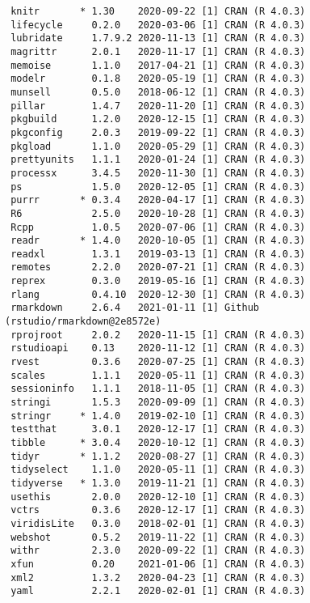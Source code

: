 \documentclass[twoside,12pt,final]{ucthesis-CA2012}
\begin{document}
\begin{ucmainmatter}
\begin{verbatim}
 knitr       * 1.30    2020-09-22 [1] CRAN (R 4.0.3)                       
 lifecycle     0.2.0   2020-03-06 [1] CRAN (R 4.0.3)                       
 lubridate     1.7.9.2 2020-11-13 [1] CRAN (R 4.0.3)                       
 magrittr      2.0.1   2020-11-17 [1] CRAN (R 4.0.3)                       
 memoise       1.1.0   2017-04-21 [1] CRAN (R 4.0.3)                       
 modelr        0.1.8   2020-05-19 [1] CRAN (R 4.0.3)                       
 munsell       0.5.0   2018-06-12 [1] CRAN (R 4.0.3)                       
 pillar        1.4.7   2020-11-20 [1] CRAN (R 4.0.3)                       
 pkgbuild      1.2.0   2020-12-15 [1] CRAN (R 4.0.3)                       
 pkgconfig     2.0.3   2019-09-22 [1] CRAN (R 4.0.3)                       
 pkgload       1.1.0   2020-05-29 [1] CRAN (R 4.0.3)                       
 prettyunits   1.1.1   2020-01-24 [1] CRAN (R 4.0.3)                       
 processx      3.4.5   2020-11-30 [1] CRAN (R 4.0.3)                       
 ps            1.5.0   2020-12-05 [1] CRAN (R 4.0.3)                       
 purrr       * 0.3.4   2020-04-17 [1] CRAN (R 4.0.3)                       
 R6            2.5.0   2020-10-28 [1] CRAN (R 4.0.3)                       
 Rcpp          1.0.5   2020-07-06 [1] CRAN (R 4.0.3)                       
 readr       * 1.4.0   2020-10-05 [1] CRAN (R 4.0.3)                       
 readxl        1.3.1   2019-03-13 [1] CRAN (R 4.0.3)                       
 remotes       2.2.0   2020-07-21 [1] CRAN (R 4.0.3)                       
 reprex        0.3.0   2019-05-16 [1] CRAN (R 4.0.3)                       
 rlang         0.4.10  2020-12-30 [1] CRAN (R 4.0.3)                       
 rmarkdown     2.6.4   2021-01-11 [1] Github (rstudio/rmarkdown@2e8572e)   
 rprojroot     2.0.2   2020-11-15 [1] CRAN (R 4.0.3)                       
 rstudioapi    0.13    2020-11-12 [1] CRAN (R 4.0.3)                       
 rvest         0.3.6   2020-07-25 [1] CRAN (R 4.0.3)                       
 scales        1.1.1   2020-05-11 [1] CRAN (R 4.0.3)                       
 sessioninfo   1.1.1   2018-11-05 [1] CRAN (R 4.0.3)                       
 stringi       1.5.3   2020-09-09 [1] CRAN (R 4.0.3)                       
 stringr     * 1.4.0   2019-02-10 [1] CRAN (R 4.0.3)                       
 testthat      3.0.1   2020-12-17 [1] CRAN (R 4.0.3)                       
 tibble      * 3.0.4   2020-10-12 [1] CRAN (R 4.0.3)                       
 tidyr       * 1.1.2   2020-08-27 [1] CRAN (R 4.0.3)                       
 tidyselect    1.1.0   2020-05-11 [1] CRAN (R 4.0.3)                       
 tidyverse   * 1.3.0   2019-11-21 [1] CRAN (R 4.0.3)                       
 usethis       2.0.0   2020-12-10 [1] CRAN (R 4.0.3)                       
 vctrs         0.3.6   2020-12-17 [1] CRAN (R 4.0.3)                       
 viridisLite   0.3.0   2018-02-01 [1] CRAN (R 4.0.3)                       
 webshot       0.5.2   2019-11-22 [1] CRAN (R 4.0.3)                       
 withr         2.3.0   2020-09-22 [1] CRAN (R 4.0.3)                       
 xfun          0.20    2021-01-06 [1] CRAN (R 4.0.3)                       
 xml2          1.3.2   2020-04-23 [1] CRAN (R 4.0.3)                       
 yaml          2.2.1   2020-02-01 [1] CRAN (R 4.0.3)                       


\end{verbatim}
\end{ucmainmatter}
\end{document}
